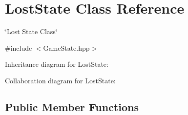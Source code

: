 \hypertarget{classLostState}{}\section{Lost\+State Class Reference}
\label{classLostState}


\char`\"{}\+Lost State Class\char`\"{}  




{\ttfamily \#include $<$Game\+State.\+hpp$>$}



Inheritance diagram for Lost\+State\+:


Collaboration diagram for Lost\+State\+:
\subsection*{Public Member Functions}
